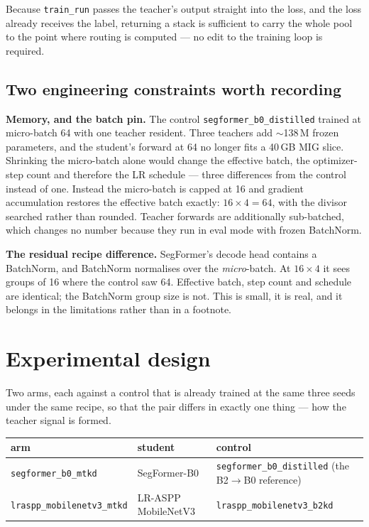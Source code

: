 \documentclass[11pt,a4paper]{article}
\begin{document}
Because \texttt{train\_run} passes the teacher's output straight into the loss,
and the loss already receives the label, returning a stack is sufficient to carry
the whole pool to the point where routing is computed --- no edit to the training
loop is required.

\subsection{Two engineering constraints worth recording}

\textbf{Memory, and the batch pin.} The control \texttt{segformer\_b0\_distilled}
trained at micro-batch 64 with one teacher resident. Three teachers add
$\sim$138\,M frozen parameters, and the student's forward at 64 no longer fits a
40\,GB MIG slice. Shrinking the micro-batch alone would change the effective
batch, the optimizer-step count and therefore the LR schedule --- three
differences from the control instead of one. Instead the micro-batch is capped at
16 and gradient accumulation restores the effective batch exactly:
$16 \times 4 = 64$, with the divisor searched rather than rounded. Teacher
forwards are additionally sub-batched, which changes no number because they run
in eval mode with frozen BatchNorm.

\textbf{The residual recipe difference.} SegFormer's decode head contains a
BatchNorm, and BatchNorm normalises over the \emph{micro}-batch. At $16\times4$ it
sees groups of 16 where the control saw 64. Effective batch, step count and
schedule are identical; the BatchNorm group size is not. This is small, it is
real, and it belongs in the limitations rather than in a footnote.

\section{Experimental design}

Two arms, each against a control that is already trained at the same three seeds
under the same recipe, so that the pair differs in exactly one thing --- how the
teacher signal is formed.

\begin{center}
\small
\begin{tabular}{lll}
\toprule
arm & student & control \\
\midrule
\texttt{segformer\_b0\_mtkd}          & SegFormer-B0 & \texttt{segformer\_b0\_distilled} (the B2$\to$B0 reference) \\
\texttt{lraspp\_mobilenetv3\_mtkd}    & LR-ASPP MobileNetV3 & \texttt{lraspp\_mobilenetv3\_b2kd} \\
\bottomrule
\end{tabular}
\end{center}
\end{document}
